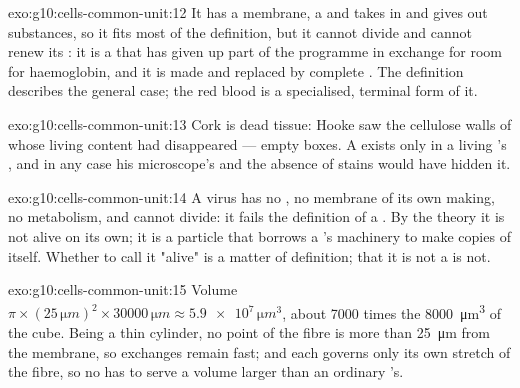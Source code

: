 \begin{solution}{exo:g10:cells-common-unit:12}
It has a membrane, a  and takes in and gives out substances,
so it fits most of the definition, but it cannot divide and cannot
renew its : it is a  that has given up part of the
programme in exchange for room for haemoglobin, and it is made and
replaced by complete . The definition describes the general case;
the red blood  is a specialised, terminal form of it.
\end{solution}

\begin{solution}{exo:g10:cells-common-unit:13}
Cork is dead tissue: Hooke saw the cellulose walls of  whose
living content had disappeared --- empty boxes. A  exists only
in a living 's , and in any case his microscope's
 and the absence of stains would have hidden it.
\end{solution}

\begin{solution}{exo:g10:cells-common-unit:14}
A virus has no , no membrane of its own making, no metabolism,
and cannot divide: it fails the definition of a . By the 
theory it is not alive on its own; it is a particle that borrows a
's machinery to make copies of itself. Whether to call it "alive"
is a matter of definition; that it is not a  is not.
\end{solution}

\begin{solution}{exo:g10:cells-common-unit:15}
Volume $\pi \times (25\,\unit{\micro m})^2 \times 30000\,\unit{\micro m}
\approx \num{5.9e7}\,\unit{\micro m^3}$, about 7000 times the
\qty{8000}{\micro m^3} of the cube. Being a thin cylinder, no point of
the fibre is more than \qty{25}{\micro m} from the membrane, so
exchanges remain fast; and each  governs only its own stretch
of the fibre, so no  has to serve a volume larger than an
ordinary 's.
\end{solution}

